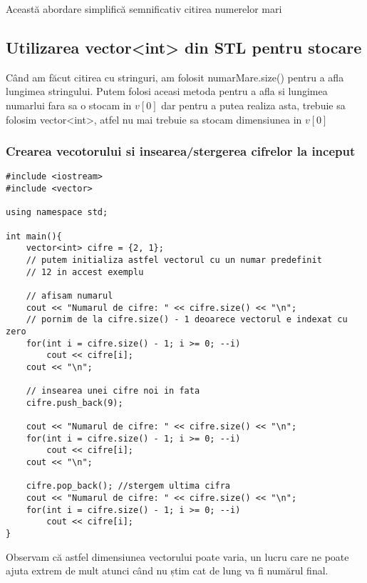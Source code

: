 Această abordare simplifică semnificativ citirea numerelor mari

\subsection{Utilizarea vector<int> din STL pentru stocare}
Când am făcut citirea cu stringuri, am folosit numarMare.size() pentru a afla lungimea stringului. Putem folosi aceasi metoda pentru a afla si lungimea numarlui fara sa o stocam in $v[0]$ dar pentru a putea realiza asta, trebuie sa folosim vector<int>, atfel nu mai trebuie sa stocam dimensiunea in $v[0]$

\subsubsection{Crearea vecotorului si insearea/stergerea cifrelor la inceput}
\begin{verbatim}
#include <iostream>
#include <vector>

using namespace std;

int main(){
    vector<int> cifre = {2, 1}; 
    // putem initializa astfel vectorul cu un numar predefinit
    // 12 in accest exemplu

    // afisam numarul
    cout << "Numarul de cifre: " << cifre.size() << "\n";
    // pornim de la cifre.size() - 1 deoarece vectorul e indexat cu zero
    for(int i = cifre.size() - 1; i >= 0; --i)
        cout << cifre[i];
    cout << "\n";

    // insearea unei cifre noi in fata
    cifre.push_back(9);

    cout << "Numarul de cifre: " << cifre.size() << "\n";
    for(int i = cifre.size() - 1; i >= 0; --i)
        cout << cifre[i];
    cout << "\n";

    cifre.pop_back(); //stergem ultima cifra
    cout << "Numarul de cifre: " << cifre.size() << "\n";
    for(int i = cifre.size() - 1; i >= 0; --i)
        cout << cifre[i];   
}
\end{verbatim}
Observam că astfel dimensiunea vectorului poate varia, un lucru care ne poate ajuta extrem de mult atunci când nu știm cat de lung va fi numărul final. 

